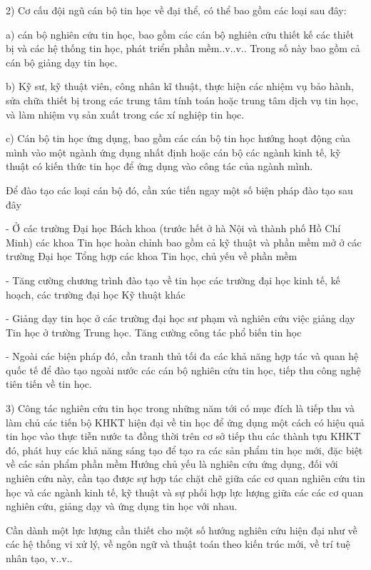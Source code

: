 \documentclass[11pt, a4paper, reqno, oneside]{book}
\begin{document}
2) Cơ cấu đội ngũ cán bộ tin học về đại thể, có thể bao gồm các loại sau đây:


a) cán bộ nghiên cứu tin học, bao gồm các cán bộ nghiên cứu thiết kế các thiết bị và các hệ thống tin học, phát triển phần mềm..v..v.. Trong số này bao gồm cả cán bộ giảng dạy tin học.


b) Kỹ sư, kỹ thuật viên, công nhân kĩ thuật, thực hiện các nhiệm vụ bảo hành, sửa chữa thiết bị trong các trung tâm tính toán hoặc trung tâm dịch vụ tin học, và làm nhiệm vụ sản xuất trong các xí nghiệp tin học.


c) Cán bộ tin học ứng dụng, bao gồm các cán bộ tin học hướng hoạt động của mình vào một ngành ứng dụng nhất định hoặc cán bộ các ngành kinh tế, kỹ thuật có kiến thức tin học để ứng dụng vào công tác của ngành mình.


Để đào tạo các loại cán bộ đó, cần xúc tiến ngay một số biện pháp đào tạo sau đây


-	Ở các trường Đại học Bách khoa (trước hết ở hà Nội và thành phố Hồ Chí Minh) các khoa Tin học hoàn chỉnh bao gồm cả kỹ thuật và phần mềm mở ở các trường Đại học Tổng hợp các khoa Tin học, chủ yếu về phần mềm


-	Tăng cường chương trình đào tạo về tin học các trường đại học kinh tế, kế hoạch, các trường đại học Kỹ thuật khác 


-	Giảng dạy tin học ở các trường đại học sư phạm và nghiên cứu việc giảng dạy Tin học ở trường Trung học. Tăng cường công tác phổ biến tin học


-	Ngoài các biện pháp đó, cần tranh thủ tối đa các khả năng hợp tác và quan hệ quốc tế để đào tạo ngoài nước các cán bộ nghiên cứu tin học, tiếp thu công nghệ tiên tiến về tin học.


3) Công tác nghiên cứu tin học trong những năm tới có mục đích là tiếp thu và làm chủ các tiến bộ KHKT hiện đại về tin học để ứng dụng một cách có hiệu quả tin học vào thực tiễn nước ta đồng thời trên cơ sở tiếp thu các thành tựu KHKT đó, phát huy các khả năng sáng tạo để tạo ra các sản phẩm tin học mới, đặc biệt về các sản phẩm phần mềm
Hướng chủ yếu là nghiên cứu ứng dụng, đối với nghiên cứu này, cần tạo được sự hợp tác chặt chẽ giữa các cơ quan nghiên cứu tin học và các ngành kinh tế, kỹ thuật và sự phối hợp lực lượng giữa các các cơ quan nghiên cứu, giảng dạy và ứng dụng tin học với nhau.


Cần dành một lực lượng cần thiết cho một số hướng nghiên cứu hiện đại như về các hệ thống vi xử lý, về ngôn ngữ và thuật toán theo kiến trúc mới, về trí tuệ nhân tạo, v..v..
\end{document}

